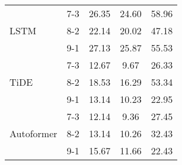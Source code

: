 \begin{table}[h!]
\begin{tabular}{|l|c|c|c|c|}
    \rowcolor{white}  & 7-3 & 26.35 & 24.60 & 58.96 \\ 
    \rowcolor{white} LSTM & 8-2 & 22.14 & 20.02 & 47.18 \\ 
    \rowcolor{white}  & 9-1 & 27.13 & 25.87 & 55.53 \\ \hline
    \rowcolor{white} & 7-3 & 12.67 & 9.67 & 26.33 \\ 
    \rowcolor{white} TiDE & 8-2 & 18.53 & 16.29 & 53.34 \\ 
    \rowcolor{white} & 9-1 & 13.14 & 10.23 & 22.95 \\ \hline
    \rowcolor{white}  & 7-3 & 12.14 & 9.36 & 27.45 \\ 
    \rowcolor{white}  Autoformer & 8-2 & 13.14 & 10.26 & 32.43 \\ 
    \rowcolor{white}  & 9-1 & 15.67 & 11.66 & 22.43 \\ \hline

    \end{tabular}
\end{table}